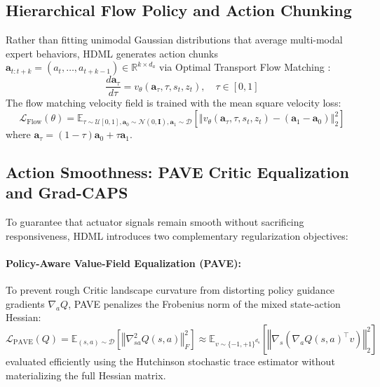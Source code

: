 \documentclass{article}
\begin{document}
\subsection{Hierarchical Flow Policy and Action Chunking}
Rather than fitting unimodal Gaussian distributions that average multi-modal expert behaviors, HDML generates action chunks $\mathbf{a}_{t:t+k} = (a_t, \dots, a_{t+k-1}) \in \mathbb{R}^{k \times d_a}$ via Optimal Transport Flow Matching \cite{lipman2023flow}:
\begin{equation}
    \frac{d \mathbf{a}_\tau}{d\tau} = v_\theta(\mathbf{a}_\tau, \tau, s_t, z_t), \quad \tau \in [0, 1]
\end{equation}
The flow matching velocity field is trained with the mean square velocity loss:
\begin{equation}
    \mathcal{L}_{\text{Flow}}(\theta) = \mathbb{E}_{\tau \sim \mathcal{U}[0, 1], \mathbf{a}_0 \sim \mathcal{N}(0, \mathbf{I}), \mathbf{a}_1 \sim \mathcal{D}} \left[ \left\Vert v_\theta(\mathbf{a}_\tau, \tau, s_t, z_t) - (\mathbf{a}_1 - \mathbf{a}_0) \right\Vert_2^2 \right]
\end{equation}
where $\mathbf{a}_\tau = (1 - \tau) \mathbf{a}_0 + \tau \mathbf{a}_1$.

\subsection{Action Smoothness: PAVE Critic Equalization and Grad-CAPS}
To guarantee that actuator signals remain smooth without sacrificing responsiveness, HDML introduces two complementary regularization objectives:

\paragraph{Policy-Aware Value-Field Equalization (PAVE):} 
To prevent rough Critic landscape curvature from distorting policy guidance gradients $\nabla_a Q$, PAVE penalizes the Frobenius norm of the mixed state-action Hessian:
\begin{equation}
    \mathcal{L}_{\text{PAVE}}(Q) = \mathbb{E}_{(s, a) \sim \mathcal{D}} \left[ \left\Vert \nabla_{sa}^2 Q(s, a) \right\Vert_F^2 \right] \approx \mathbb{E}_{v \sim \{-1, +1\}^{d_a}} \left[ \left\Vert \nabla_s \left( \nabla_a Q(s, a)^\top v \right) \right\Vert_2^2 \right]
\end{equation}
evaluated efficiently using the Hutchinson stochastic trace estimator without materializing the full Hessian matrix.
\end{document}
